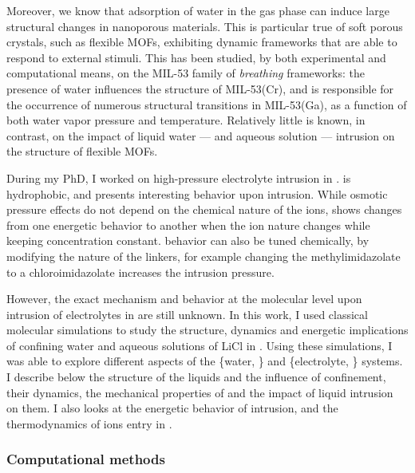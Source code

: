 \documentclass[thesis]{subfiles}
\begin{document}
Moreover, we know that adsorption of water in the gas phase can induce large
structural changes in nanoporous materials\cite{Lee2001, Seoung2013}. This is
particular true of soft porous crystals\cite{Horike2009}, such as flexible
MOFs\cite{Schneemann2014}, exhibiting dynamic frameworks that are able to
respond to external stimuli. This has been studied, by both experimental and
computational means, on the MIL-53 family of \emph{breathing} frameworks: the
presence of water influences the structure of MIL-53(Cr)\cite{Haigis2013}, and
is responsible for the occurrence of numerous structural transitions in
MIL-53(Ga), as a function of both water vapor pressure and
temperature\cite{Boutin2013, Coudert2014}. Relatively little is known, in
contrast, on the impact of liquid water --- and aqueous solution --- intrusion
on the structure of flexible MOFs.

During my PhD, I worked on high-pressure electrolyte intrusion in . 
is hydrophobic\cite{AOrtiz2014}, and presents interesting behavior upon
intrusion. While osmotic pressure effects do not depend on the chemical nature
of the ions,  shows changes from one energetic behavior to another when the
ion nature changes while keeping concentration constant\cite{Ortiz2014}. 
behavior can also be tuned chemically, by modifying the nature of the linkers,
for example changing the methylimidazolate to a chloroimidazolate increases the
intrusion pressure\cite{Mortada2018}.

However, the exact mechanism and behavior at the molecular level upon intrusion
of electrolytes in  are still unknown. In this work, I used classical
molecular simulations to study the structure, dynamics and energetic
implications of confining water and aqueous solutions of LiCl in . Using
these simulations, I was able to explore different aspects of the \{water,
\} and \{electrolyte, \} systems. I describe below the structure of
the liquids and the influence of confinement, their dynamics, the mechanical
properties of  and the impact of liquid intrusion on them. I also looks at
the energetic behavior of intrusion, and the thermodynamics of ions entry in
.

\subsubsection{Computational methods}
\end{document}
